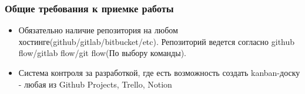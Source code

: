 \documentclass[a4paper, 14pt]{article}
\begin{document}
\subsubsection{Общие требования к приемке работы}

\begin{itemize}
    \item Обязательно наличие репозитория на любом хостинге(github/gitlab/bitbucket/etc). Репозиторий ведется согласно github flow/gitlab flow/git flow(По выбору команды).
    \item Система контроля за разработкой, где есть возможность создать kanban-доску - любая из Github Projects, Trello, Notion 
\end{itemize}
\end{document}
